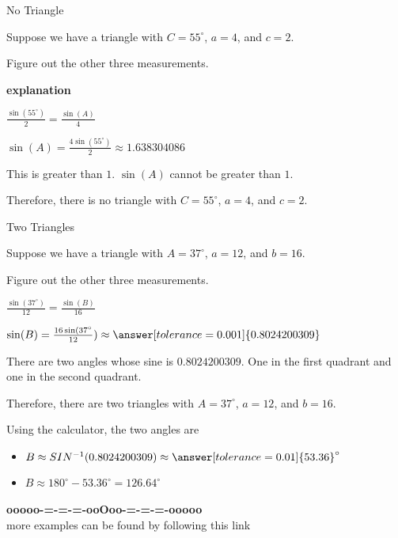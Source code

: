 \documentclass{ximera}
\begin{document}
\begin{example}  No Triangle 

Suppose we have a triangle with $C=55^{\circ}$, $a=4$, and $c=2$.

Figure out the other three measurements.


\textbf{\textcolor{red!75!green}{explanation}} 


$\frac{\sin(55^{\circ})}{2} = \frac{\sin(A)}{4}$

$\sin(A) = \frac{4 \sin(55^{\circ})}{2} \approx 1.638304086$

This is greater than $1$. $\sin(A)$ cannot be greater than $1$.

Therefore, there is no triangle with $C=55^{\circ}$, $a=4$, and $c=2$. 




\end{example}












\begin{example}  Two Triangles 

Suppose we have a triangle with $A=37^{\circ}$, $a=12$, and $b=16$.

Figure out the other three measurements.





$\frac{\sin(37^{\circ})}{12} = \frac{\sin(B)}{16}$

$\sin(B) = \frac{16 \sin(37^{\circ}}{12}) \approx \answer[tolerance=0.001]{0.8024200309}$

There are two angles whose sine is $0.8024200309$. One in the first quadrant and one in the second quadrant. 

Therefore, there are two triangles with $A=37^{\circ}$, $a=12$, and $b=16$. 

Using the calculator, the two angles are

\begin{itemize}
\item $B \approx SIN^{-1}(0.8024200309) \approx \answer[tolerance=0.01]{53.36}^{\circ}$
\item $B \approx 180^{\circ} - 53.36^{\circ} = 126.64^{\circ}$
\end{itemize}




\end{example}














\begin{center}
\textbf{\textcolor{green!50!black}{ooooo-=-=-=-ooOoo-=-=-=-ooooo}} \\

more examples can be found by following this link\\ 

\end{center}
\end{document}
